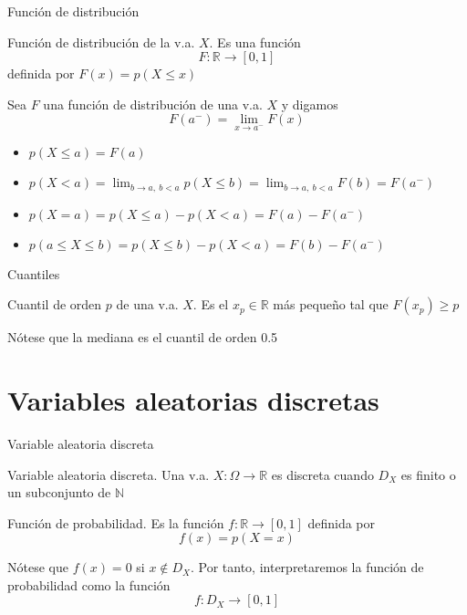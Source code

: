 \documentclass[
  ignorenonframetext,
]{beamer}
\providecommand{\tightlist}{%
  \setlength{\itemsep}{0pt}\setlength{\parskip}{0pt}}
\begin{document}
\begin{frame}{Función de distribución}
\protect\hypertarget{funciuxf3n-de-distribuciuxf3n}{}

Función de distribución de la v.a. \(X\). Es una función
\[F:\mathbb{R}\longrightarrow [0,1]\] definida por \(F(x)=p(X\le x)\)

Sea \(F\) una función de distribución de una v.a. \(X\) y digamos
\[F(a^-)=\lim_{x\rightarrow a^-}F(x)\]

\begin{itemize}
\tightlist
\item
  \(p(X\le a)=F(a)\)
\item
  \(p(X<a)=\lim_{b\rightarrow a,\  b<a}p(X\le b) = \lim_{b\rightarrow a,\  b<a} F(b) = F(a^-)\)
\item
  \(p(X=a) = p(X\le a)-p(X<a)=F(a)-F(a^-)\)
\item
  \(p(a\le X\le b) = p(X\le b)-p(X< a)=F(b)-F(a^-)\)
\end{itemize}

\end{frame}

\begin{frame}{Cuantiles}
\protect\hypertarget{cuantiles}{}

Cuantil de orden \(p\) de una v.a. \(X\). Es el \(x_p\in\mathbb{R}\) más
pequeño tal que \(F(x_p)\ge p\)

Nótese que la mediana es el cuantil de orden 0.5

\end{frame}

\hypertarget{variables-aleatorias-discretas}{%
\section{Variables aleatorias
discretas}\label{variables-aleatorias-discretas}}

\begin{frame}{Variable aleatoria discreta}
\protect\hypertarget{variable-aleatoria-discreta}{}

Variable aleatoria discreta. Una v.a.
\(X:\Omega\longrightarrow \mathbb{R}\) es discreta cuando \(D_X\) es
finito o un subconjunto de \(\mathbb{N}\)

Función de probabilidad. Es la función
\(f:\mathbb{R}\longrightarrow[0,1]\) definida por \[f(x) = p(X=x)\]

Nótese que \(f(x)=0\) si \(x\not\in D_X\). Por tanto, interpretaremos la
función de probabilidad como la función \[f:D_X\longrightarrow [0,1]\]

\end{frame}
\end{document}

